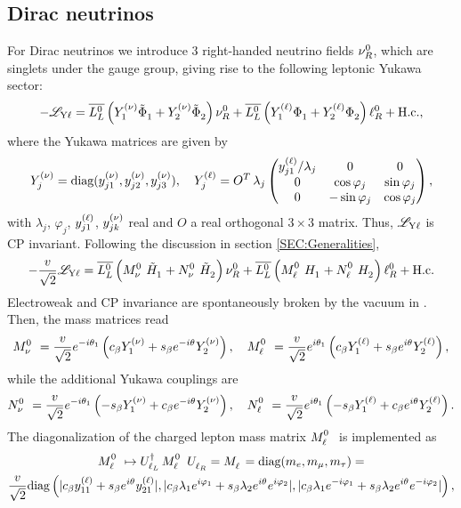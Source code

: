 \documentclass[12pt,a4paper]{article}
\begin{document}
\subsection{Dirac neutrinos\label{sSEC:Dirac}}
For Dirac neutrinos we introduce 3 right-handed neutrino fields $\nu_R^0$, which are singlets under the gauge group, giving rise to the following leptonic Yukawa sector:
\begin{equation}\label{eq:LYukLep:00}
 -\mathscr L_{\rm Y\ell}=\wLLb\left(\YN{1}\SDC{1}+\YN{2}\SDC{2}\right)\wNR+\wLLb\left(\YL{1}\SD{1}+\YL{2}\SD{2}\right)\wLR+\Hc,
\end{equation}
where the Yukawa matrices are given by
\begin{equation}\label{eq:YukLepMat:00}
Y_{j}^{\rm (\nu)}=\text{diag}(y_{j1}^{\rm (\nu)},y_{j2}^{\rm (\nu)},y_{j3}^{\rm (\nu)}), \quad Y_{j}^{\rm (\ell)} =O^T\,\lambda_j\begin{pmatrix}y_{j1}^{\rm (\ell)}/\lambda_j & 0 & 0\\ 0 & \cos\varphi_j & \sin\varphi_j\\ 0 & -\sin\varphi_j & \cos\varphi_j\end{pmatrix}, 
\end{equation}
with $\lambda_j$, $\varphi_j$, $y_{j1}^{\rm (\ell)}$, $y_{jk}^{\rm (\nu)}$ real and $O$ a real orthogonal $3\times 3$ matrix. Thus, $\mathscr L_{\rm Y\ell}$ is CP invariant. Following the discussion in section \ref{SEC:Generalities}, 
\begin{equation}\label{eq:LYukLep:01}
 -\frac{\vev{}}{\sqrt{2}}\mathscr L_{\rm Y\ell}=\wLLb\left(\wMN\HSDC{1}+\wNN\HSDC{2}\right)\wNR+\wLLb\left(\wML\HSD{1}+\wNL\HSD{2}\right)\wLR+\Hc
\end{equation}
Electroweak and CP invariance are spontaneously broken by the vacuum in . Then, the mass matrices read
\begin{equation}\label{eq:MassMatricesLep:00}
 \wMN=\frac{\vev{}}{\sqrt 2}e^{-i\vevPh{1}}\left(\Cb\YN{1}+\Sb e^{-i\vevPh{}}\YN{2}\right),\quad 
 \wML=\frac{\vev{}}{\sqrt 2}e^{i\vevPh{1}}\left(\Cb\YL{1}+\Sb e^{i\vevPh{}}\YL{2}\right),
\end{equation}
while the additional Yukawa couplings are
\begin{equation}\label{eq:NMatricesLep:00}
\wNN=\frac{\vev{}}{\sqrt 2}e^{-i\vevPh{1}}\left(-\Sb\YN{1}+\Cb e^{-i\vevPh{}}\YN{2}\right),\quad 
\wNL=\frac{\vev{}}{\sqrt 2}e^{i\vevPh{1}}\left(-\Sb\YL{1}+\Cb e^{i\vevPh{}}\YL{2}\right).
\end{equation}
The diagonalization of the charged lepton mass matrix $\wML$ is implemented as
\begin{multline}\label{eq:MassMatricesLep:01}
\wML\mapsto \ULLd\,\wML\,\URL=\mML=\text{diag}(m_e,m_\mu,m_\tau)=\\ \frac{\vev{}}{\sqrt 2}\text{diag}\left(\abs{\Cb\yL{11}+\Sb e^{i\vevPh{}}\yL{21}},\abs{\Cb\lambda_{1}e^{i\varphi_1}+\Sb\lambda_2 e^{i\vevPh{}}e^{i\varphi_2}},\abs{\Cb\lambda_{1}e^{-i\varphi_1}+\Sb\lambda_2 e^{i\vevPh{}}e^{-i\varphi_2}}\right),
\end{multline}
\end{document}
